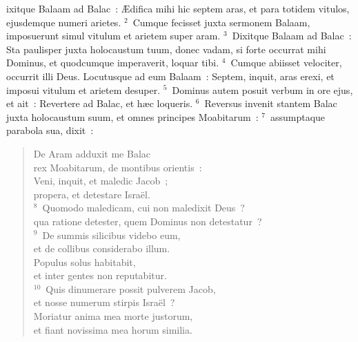 \bchapter
{}ixitque Balaam ad Balac~: \AE difica mihi hic septem aras, et para totidem vitulos, ejusdemque numeri arietes.
${}^{2}$~Cumque fecisset juxta sermonem Balaam, imposuerunt simul vitulum et arietem super aram.
${}^{3}$~Dixitque Balaam ad Balac~: Sta paulisper juxta holocaustum tuum, donec vadam, si forte occurrat mihi Dominus, et quodcumque imperaverit, loquar tibi.
${}^{4}$~Cumque abiisset velociter, occurrit illi Deus. Locutusque ad eum Balaam~: Septem, inquit, aras erexi, et imposui vitulum et arietem desuper.
${}^{5}$~Dominus autem posuit verbum in ore ejus, et ait~: Revertere ad Balac, et h\ae c loqueris.
${}^{6}$~Reversus invenit stantem Balac juxta holocaustum suum, et omnes principes Moabitarum~:
${}^{7}$~assumptaque parabola sua, dixit~: \begin{verse}De Aram adduxit me Balac\\ rex Moabitarum, de montibus orientis~:\\ Veni, inquit, et maledic Jacob~;\\ propera, et detestare Isra\"el.\\
${}^{8}$~Quomodo maledicam, cui non maledixit Deus~?\\ qua ratione detester, quem Dominus non detestatur~?\\
${}^{9}$~De summis silicibus videbo eum,\\ et de collibus considerabo illum.\\ Populus solus habitabit,\\ et inter gentes non reputabitur.\\
${}^{10}$~Quis dinumerare possit pulverem Jacob,\\ et nosse numerum stirpis Isra\"el~?\\ Moriatur anima mea morte justorum,\\ et fiant novissima mea horum similia.\end{verse}


